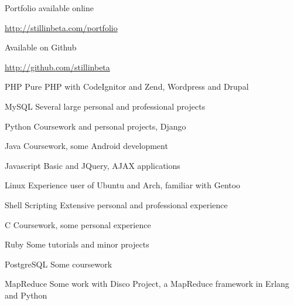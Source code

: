 \documentclass[letterpaper,11pt,notitlepage]{article}
\begin{document}
\vbar
{}
        \begin{employment}
            \item Portfolio available online
            \item \url{http://stillinbeta.com/portfolio}
        \end{employment}
        \begin{employment}
            \item Available on Github
            \item \url{http://github.com/stillinbeta}
        \end{employment}
\vbar
{}
\begin{description*}
\item[PHP] Pure PHP with CodeIgnitor and Zend, Wordpress and Drupal
\item[MySQL] Several large personal and professional projects
\item[Python] Coursework and personal projects, Django
\item[Java] Coursework, some Android development
\item[Javascript] Basic and JQuery, AJAX applications
\item[Linux] Experience user of Ubuntu and Arch, familiar with Gentoo
\item[Shell Scripting] Extensive personal and professional experience
\item 
\item[C] Coursework, some personal experience
\item[Ruby] Some tutorials and minor projects
\item[PostgreSQL] Some coursework
\item[MapReduce] Some work with Disco Project, a MapReduce framework in Erlang and Python
\end{description*}
\end{document}
